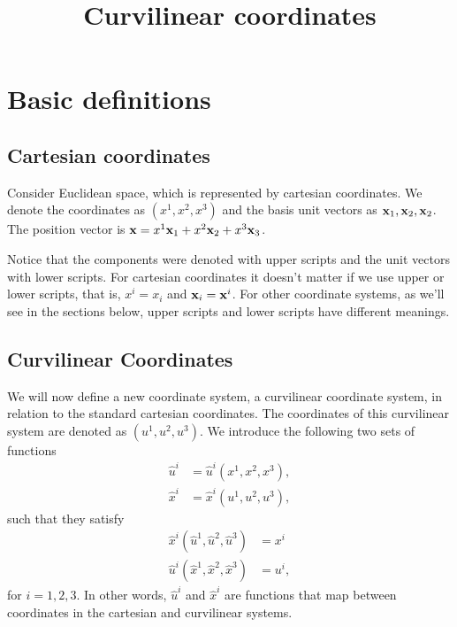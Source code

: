 \documentclass[11pt]{article}
\title{Curvilinear coordinates}
\newcommand{\uhat}{\hat{u}}
\newcommand{\xhat}{\hat{x}}
\begin{document}
\maketitle

\section{Basic definitions}
\subsection{Cartesian coordinates}
Consider Euclidean space, which is represented by cartesian coordinates. We denote the coordinates as $(x^1,x^2,x^3)$ and the basis unit vectors as $\mathbf{x}_1, \mathbf{x}_2, \mathbf{x}_2$. The position vector is $\mathbf{x} = x^1 \mathbf{x}_1 + x^2 \mathbf{x}_2 + x^3 \mathbf{x}_3$. 

Notice that the components were denoted with upper scripts and the unit vectors with lower scripts. For cartesian coordinates it doesn't matter if we use upper or lower scripts, that is, $x^i = x_i$ and $\mathbf{x}_i=\mathbf{x}^i$. For other coordinate systems, as we'll see in the sections below, upper scripts and lower scripts have different meanings.

\subsection{Curvilinear Coordinates}
We will now define a new coordinate system, a curvilinear coordinate system, in relation to the standard cartesian coordinates. The coordinates of this curvilinear system are denoted as $(u^1, u^2, u^3)$. We introduce the following two sets of functions
\begin{align}
\uhat^i &= \uhat^i(x^1, x^2, x^3), \\
\xhat^i &= \xhat^i(u^1,u^2,u^3),
\end{align}
such that they satisfy
\begin{align}
    \xhat^i(\uhat^1, \uhat^2, \uhat^3) &= x^i \label{eq:trans1}\\
    \uhat^i(\xhat^1, \xhat^2, \xhat^3) &= u^i \label{eq:trans2},
\end{align}
for $i=1,2,3$. In other words, $\hat{u}^i$ and $\hat{x}^i$ are functions that map between coordinates in the cartesian and curvilinear systems. 
\end{document}

